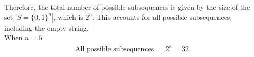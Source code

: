 \documentclass[9pt]{exam}
\begin{document}
\begin{parts}
\begin{customsolutionbox}
        Therefore, the total number of possible subsequences is given by the size of the set $|S = \{0, 1\}^n|$, which is  $2^n$. This accounts for all possible subsequences, including the empty string. \\

        When $n = 5$
        \begin{gather}
            \text{All possible subsequences } = 2^5 = 32
        \end{gather}
    \end{customsolutionbox}
\end{parts}
\end{document}
